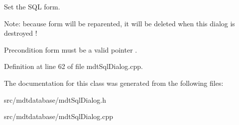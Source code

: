 Set the SQL form. 

Note: because form will be reparented, it will be deleted when this dialog is destroyed !

\begin{DoxyPrecond}{Precondition}
form must be a valid pointer . 
\end{DoxyPrecond}


Definition at line 62 of file mdtSqlDialog.cpp.



The documentation for this class was generated from the following files:\begin{DoxyCompactItemize}
\item 
src/mdtdatabase/mdtSqlDialog.h\item 
src/mdtdatabase/mdtSqlDialog.cpp\end{DoxyCompactItemize}

